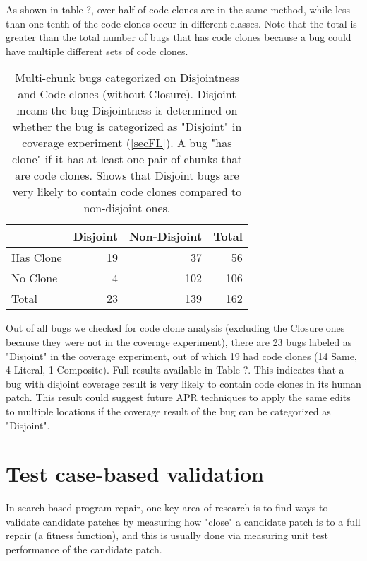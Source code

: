 \documentclass[sigconf, timestamp-false, anonymous=true]{acmart}
\begin{document}
As shown in table ?, over half of code clones are in the same method, while less than
one tenth of the code clones occur in different classes. Note that the total is greater
than the total number of bugs that has code clones because a bug could have multiple different 
sets of code clones.

\begin{table}
{\begin{center}
\begin{tabular} {| l | r r | r |}
\hline
& Disjoint & Non-Disjoint & Total \\
\hline
Has Clone & 19 & 37 & 56 \\
No Clone & 4 & 102 & 106 \\ \hline
Total & 23 & 139 & 162 \\ \hline
\end{tabular}
\end{center}
}
\caption{Multi-chunk bugs categorized on Disjointness and Code clones (without Closure). Disjoint means the bug
Disjointness is determined on whether the bug is categorized as "Disjoint" in coverage experiment (\ref{secFL}).
A bug "has clone" if it has at least one pair of chunks that are code clones. Shows that Disjoint bugs are
very likely to contain code clones compared to non-disjoint ones.}
\end{table}

Out of all bugs we checked for code clone analysis (excluding the Closure ones because they were not in the coverage experiment), there are 23 bugs labeled as "Disjoint" in the coverage experiment, out of which
19 had code clones (14 Same, 4 Literal, 1 Composite). Full results available in Table ?. This indicates that a 
bug with disjoint coverage result is very likely to contain code clones in its
human patch. This result could suggest future APR techniques to apply the same edits to multiple locations
if the coverage result of the bug can be categorized as "Disjoint". 



\section{Test case-based validation}

In search based program repair, one key area of research is to find ways to validate
candidate patches by
measuring how "close" a candidate patch is to a full repair (a fitness function),
and this is usually done via measuring unit test performance of the candidate patch. 
\end{document}

